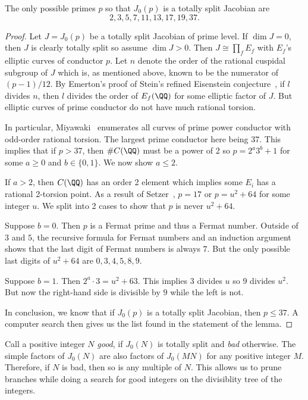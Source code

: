 \documentclass{article}
\begin{document}
\begin{lemma}
    \label{lemma:good_primes}
    The only possible primes $p$ so that $J_0(p)$ is a totally split Jacobian are
    \[
        2, 3, 5, 7, 11, 13, 17, 19, 37.
    \]
\end{lemma}
\begin{proof}
    Let $J=J_0(p)$ be a totally split Jacobian of prime level. If $\dim J=0$,
    then $J$ is clearly totally split so assume $\dim J>0$. Then $J\cong
    \prod_f E_f$ with $E_f$'s elliptic curves of conductor $p$. Let $n$ denote
    the order of the rational cuspidal subgroup of $J$ which is, as mentioned
    above, known to be the numerator of $(p-1)/12$. By Emerton's proof of
    Stein's refined Eisenstein conjecture~\cite[Theorem B]{emerton:optimal}, if
    $l$ divides $n$, then $l$ divides the order of $E_f(\QQ)$ for some elliptic
    factor of $J$. But elliptic curves of prime conductor do not have much
    rational torsion.

    In particular, Miyawaki~\cite{miyawaki:ell_prime} enumerates all curves of prime
    power conductor with odd-order rational torsion. The largest prime
    conductor here being 37. This implies that if $p>37$, then $\#C(\QQ)$ must
    be a power of 2 so $p=2^a 3^b + 1$ for some $a\geq 0$ and $b\in \{0,1\}$.
    We now show $a\leq 2$.

    If $a>2$, then $C(\QQ)$ has an order 2 element which implies some $E_i$ has
    a rational 2-torsion point. As a result of Setzer~\cite[Theorem
    2]{setzer:ell_prime}, $p=17$ or $p=u^2+64$ for some integer $u$. We split into 2
    cases to show that $p$ is never $u^2+64$.

    Suppose $b=0$. Then $p$ is a Fermat prime and thus a Fermat number. Outside
    of $3$ and $5$, the recursive formula for Fermat numbers and an induction
    argument shows that the last digit of Fermat numbers is always $7$. But the
    only possible last digits of $u^2+64$ are $0, 3, 4, 5, 8, 9$.

    Suppose $b=1$. Then $2^a\cdot 3 = u^2+63$. This implies $3$ divides $u$ so
    $9$ divides $u^2$. But now the right-hand side is divisible by $9$ while the
    left is not.

    In conclusion, we know that if $J_0(p)$ is a totally split Jacobian, then $p\leq
    37$. A computer search then gives us the list found in the statement of the
    lemma.
\end{proof}

Call a positive integer $N$ \emph{good}, if $J_0(N)$ is totally split and
\emph{bad} otherwise. The simple factors of $J_0(N)$ are also factors of
$J_0(MN)$ for any positive integer $M$. Therefore, if $N$ is bad, then so is
any multiple of $N$. This allows us to prune branches while doing a search for
good integers on the divisiblity tree of the integers.
\end{document}
